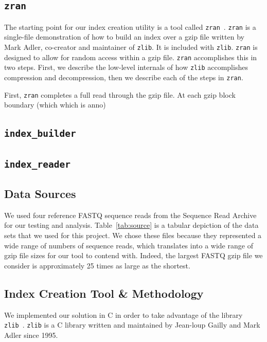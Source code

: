 \documentclass[unnumsec,webpdf,contemporary,large]{oup-authoring-template}
\newcommand{\zlib}{\texttt{zlib}\xspace}
\newcommand{\zran}{\texttt{zran}\xspace}
\newcommand{\ibuilder}{\texttt{index\_builder}\xspace}
\newcommand{\ireader}{\texttt{index\_reader}\xspace}
\newcommand{\gzip}{gzip\xspace}
\begin{document}
\subsection{\zran}
\label{sec:zran}

The starting point for our index creation utility is a tool called
\zran~\cite{zran}. \zran
is a single-file demonstration of how to build an index over a \gzip file
written by Mark Adler, co-creator and maintainer of \zlib. It is included with
\zlib. \zran is designed to allow for random access within a \gzip file. \zran
accomplishes this in two steps. First, we describe the low-level internals of
how \zlib accomplishes compression and decompression, then we describe each of
the steps in \zran.

First, \zran completes a full read through the \gzip file. At each \gzip block
boundary (which which is anno)

\subsection{\ibuilder}
\label{sec:ibuilder}

\subsection{\ireader}
\label{sec:ireader}

\subsection{Data Sources}

We used four reference FASTQ sequence reads from the Sequence Read
Archive~\cite{SRA} for our testing and analysis. Table~\ref{tab:source} is a
tabular depiction of the data sets that we used for this project. We chose these
files because they represented a wide range of numbers of sequence reads, which
translates into a wide range of \gzip file sizes for our tool to contend with.
Indeed, the largest FASTQ \gzip file we consider is approximately 25 times as
large as the shortest.

\subsection{Index Creation Tool \& Methodology}

We implemented our solution in C in order to take advantage of the library
\zlib~\cite{zlib}. \zlib is a C library written and maintained by Jean-loup
Gailly and Mark Adler since 1995. 
\end{document}
